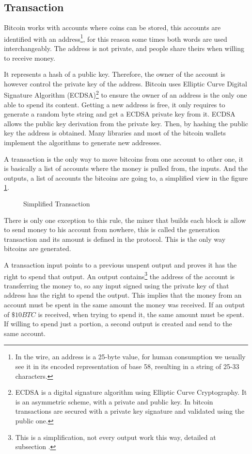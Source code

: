 \subsection{Transaction}\label{subsec:Transaction}
Bitcoin works with accounts where coins can be stored, this accounts are
  identified with an address\footnote{
  In the wire, an address is a 25-byte value, for human consumption we usually
    see it in its encoded representation of base 58, resulting in a string of
    25-33 characters.}, for this reason some times both words are used
  interchangeably.
The address is not private, and people share theirs when willing to receive
  money.

It represents a hash of a public key. Therefore, the owner of the account is
  however control the private key of the address.
Bitcoin uses Elliptic Curve Digital Signature Algorithm (ECDSA)\footnote{
  ECDSA is a digital signature algorithm using Elliptic Curve
    Cryptography. It is an asymmetric scheme, with a private and public key. In
    bitcoin transactions are secured with a private key signature and validated
    using the public one.} to ensure the owner of an address is the only one able
  to spend its content.
Getting a new address is free, it only requires to generate a random byte string
  and get a ECDSA private key from it. ECDSA allows the public key derivation
  from the private key. Then, by hashing the public key the address is obtained.
Many libraries and most of the bitcoin wallets implement the algorithms to
  generate new addresses.

A transaction is the only way to move bitcoins from one account to other one,
  it is basically a list of accounts where the money is pulled from, the
  inputs.
And the outputs, a list of accounts the bitcoins are going to, a simplified
  view in the figure \ref{fig:simplified_transaction}.

\begin{figure}
	\centering
	
	\caption{Simplified Transaction}
	\label{fig:simplified_transaction}
\end{figure}

There is only one exception to this rule, the miner that builds each block is
  allow to send money to his account from nowhere, this is called the generation
  transaction and its amount is defined in the protocol.
This is the only way bitcoins are generated.

A transaction input points to a previous unspent output and proves it has the
  right to spend that output.
An output contains\footnote{This is a simplification, not every output work this
  way, detailed at subsection \label{subsec:script}.} the address of the account
  is transferring the money to, so any input signed using the private key of
  that address has the right to spend the output.
This implies that the money from an account must be spent in the same amount
  the money was received. If an output of $\$ 10BTC$ is received, when trying
  to spend it, the same amount must be spent. If willing to spend just a
  portion, a second output is created and send to the same account.

